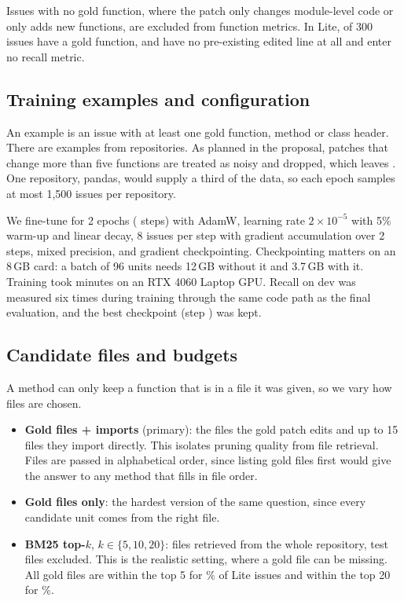 Issues with no gold function, where the patch only changes module-level code or only adds new functions, are excluded from function metrics. In Lite,  of 300 issues have a gold function, and  have no pre-existing edited line at all and enter no recall metric.

\subsection{Training examples and configuration}

An example is an issue with at least one gold function, method or class header. There are  examples from  repositories. As planned in the proposal, patches that change more than five functions are treated as noisy and dropped, which leaves . One repository, pandas, would supply a third of the data, so each epoch samples at most 1{,}500 issues per repository.

We fine-tune for 2 epochs ( steps) with AdamW, learning rate $2\times10^{-5}$ with 5\% warm-up and linear decay, 8 issues per step with gradient accumulation over 2 steps, mixed precision, and gradient checkpointing. Checkpointing matters on an 8\,GB card: a batch of 96 units needs 12\,GB without it and 3.7\,GB with it. Training took  minutes on an RTX 4060 Laptop GPU. Recall on dev was measured six times during training through the same code path as the final evaluation, and the best checkpoint (step ) was kept.

\subsection{Candidate files and budgets}

A method can only keep a function that is in a file it was given, so we vary how files are chosen.

\begin{itemize}
\item \textbf{Gold files + imports} (primary): the files the gold patch edits and up to 15 files they import directly. This isolates pruning quality from file retrieval. Files are passed in alphabetical order, since listing gold files first would give the answer to any method that fills in file order.
\item \textbf{Gold files only}: the hardest version of the same question, since every candidate unit comes from the right file.
\item \textbf{BM25 top-$k$}, $k \in \{5, 10, 20\}$: files retrieved from the whole repository, test files excluded. This is the realistic setting, where a gold file can be missing. All gold files are within the top 5 for \% of Lite issues and within the top 20 for \%.
\end{itemize}

